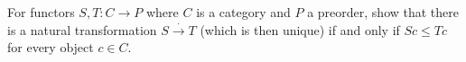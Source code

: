 For functors $S, T: C \rightarrow P$ where $C$ is a category and $P$ a preorder, show that there is a natural transformation $S \xrightarrow{\cdot} T$ (which is then unique) if and only if $Sc \leq Tc$ for every object $c \in C$.